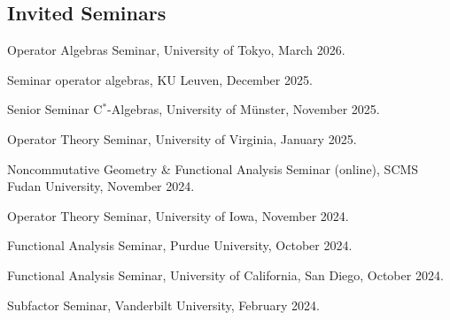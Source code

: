 \documentclass[10pt,a4paper]{article}
\renewenvironment{itemize}{
  \begin{list}{}{
      \setlength{\leftmargin}{1.5em}
      \setlength{\itemsep}{0.25em}
      \setlength{\parskip}{0pt}
      \setlength{\parsep}{0.25em}
    }
}{
  \end{list}
}
\begin{document}
\subsection*{Invited Seminars}
\begin{itemize}
        \item Operator Algebras Seminar, University of Tokyo, March 2026.
        \item Seminar operator algebras, KU Leuven, December 2025.
        \item Senior Seminar C$^*$-Algebras, University of M\"unster, November 2025.
        \item Operator Theory Seminar, University of Virginia, January 2025.
        \item Noncommutative Geometry \& Functional Analysis Seminar (online), SCMS Fudan University, November 2024.
        \item Operator Theory Seminar, University of Iowa, November 2024.
        \item Functional Analysis Seminar, Purdue University, October 2024.
        \item Functional Analysis Seminar, University of California, San Diego, October 2024.
		\item Subfactor Seminar, Vanderbilt University, February 2024.
\end{itemize}

\iffalse
\end{document}
